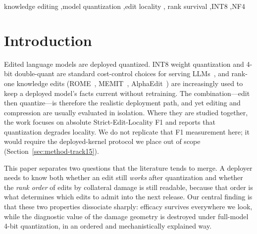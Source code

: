 \documentclass[preprint,12pt]{elsarticle}
\begin{document}
\begin{frontmatter}
\begin{abstract}
holds at \pWithinNfFMQOneRome{}--\pWithinNfFMLOneRome{} for ROME where cross-probe rank
falls to \pFlatNfFMQOneRome{}. Post hoc, the ratio of injected base noise to
edit-attributable damage orders cross-probe rank survival across all 36 arm-cells at
Spearman $\rho=\pNsrRhoFlat{}$, against $\rho=\pNoiseRhoFlat{}$ for unnormalised noise
on the same outcome. Two consequences follow. Restricting the quantizer to the edited
layer and preferring INT8 both act by shrinking injected noise, and edited-layer INT8 is
the only arm preserving the diagnostic in all nine cells --- a deployment rule that
costs nothing to apply. And a paired hierarchical bootstrap ($n=\pBootNBoot{}$, paired
on edits) finds \emph{none} of \pBootNContrasts{} editor contrasts distinguishable at
95\%, so the editor ordering suggested by point estimates alone is not supported.
\end{abstract}

\begin{keyword}
knowledge editing \sep model quantization \sep edit locality \sep
rank survival \sep INT8 \sep NF4
\end{keyword}

\end{frontmatter}

\section{Introduction}
\label{sec:intro}

Edited language models are deployed quantized. INT8 weight quantization and 4-bit
double-quant are standard cost-control choices for serving
LLMs~\cite{hallucinationsurvey2023,kesurvey2023}, and rank-one knowledge edits
(ROME~\cite{rome2022}, MEMIT~\cite{memit2023}, AlphaEdit~\cite{alphaedit2025}) are
increasingly used to keep a deployed model's facts current without retraining. The
combination---edit then quantize---is therefore the realistic deployment path, and yet
editing and compression are usually evaluated in isolation. Where they are studied
together, the work focuses on absolute Strict-Edit-Locality F1 and reports that
quantization degrades locality. We do not replicate that F1 measurement here; it would
require the deployed-kernel protocol we place out of scope
(Section~\ref{sec:method-track15}).

This paper separates two questions that the literature tends to merge. A deployer needs
to know both whether an edit still \emph{works} after quantization and whether the
\emph{rank order} of edits by collateral damage is still readable, because that order is
what determines which edits to admit into the next release. Our central finding is that
these two properties dissociate sharply: efficacy survives everywhere we look, while the
diagnostic value of the damage geometry is destroyed under full-model 4-bit
quantization, in an ordered and mechanistically explained way.
\end{document}

